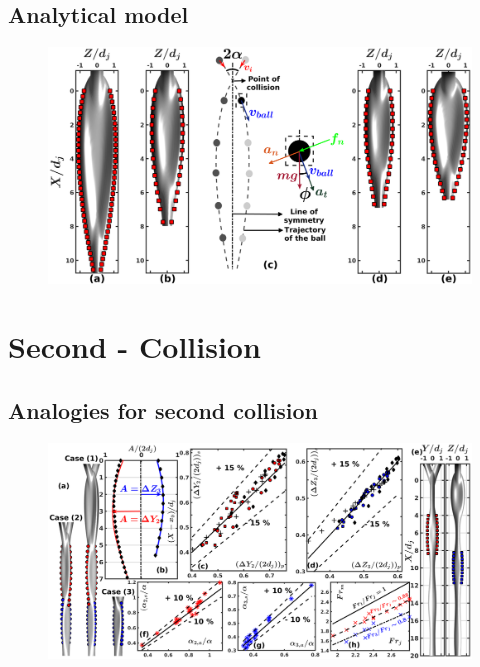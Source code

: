 \documentclass[%
aip,
sd,%
amsmath,amssymb,
preprint,%
author-year,%
]{revtex4-1}
\begin{document}
\subsection{Analytical model}
\lipsum[1]
\begin{figure}
	\centering
	\includegraphics[width=\linewidth]{analytical}
	\caption{}
	\label{Figure::analytical}
\end{figure}
\lipsum[1]

\lipsum[1]
\section{Second - Collision}
\lipsum[1]
\subsection{Analogies for second collision}
\lipsum
\begin{figure}
	\centering
	\includegraphics[width=\linewidth]{secondCollision}
	\caption{}
	\label{Figure::secondCollision}
\end{figure}
\lipsum
\end{document}
